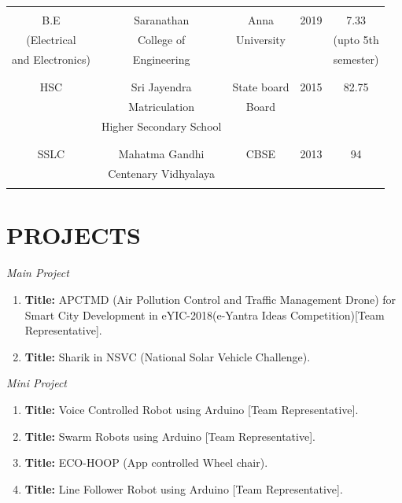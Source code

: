 \documentclass[margin,line]{res}
\begin{document}
\begin{resume}
\begin{tabular}{|c|c|c|c|c|}
&&&&\\
B.E &Saranathan&Anna &2019&7.33\\ 
(Electrical&College of&University& &(upto 5th\\
and Electronics)&Engineering& & &semester)\\ 
&&&&\\ \hline

&&&&\\
HSC&Sri Jayendra&State board&2015&82.75\\
 &Matriculation&Board&&\\
 &Higher Secondary School&&&\\ 
&&&&\\ \hline

&&&&\\
 SSLC&Mahatma Gandhi&CBSE&2013&94\\
 &Centenary Vidhyalaya&&&\\ 
 &&&&\\ \hline
\end{tabular}


\section{\sc PROJECTS}
{\em Main Project}\\
\begin{enumerate}
\item \textbf{Title:} APCTMD (Air Pollution Control and Traffic Management Drone) for Smart City Development in eYIC-2018(e-Yantra Ideas Competition)[Team Representative].\\
\item \textbf{Title:} Sharik in NSVC (National Solar Vehicle Challenge).\\
\end{enumerate}

{\em Mini Project}\\
\begin{enumerate}
\item \textbf{Title:} Voice Controlled Robot using Arduino [Team Representative].\\
\item \textbf{Title:} Swarm Robots using Arduino [Team Representative].\\
\item \textbf{Title:} ECO-HOOP (App controlled Wheel chair).\\
\item \textbf{Title:} Line Follower Robot using Arduino [Team Representative].\\
\end{enumerate}



\end{resume}
\end{document}
